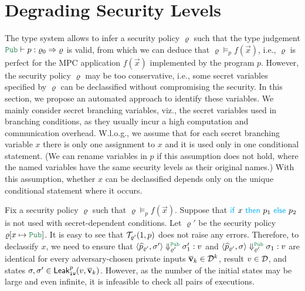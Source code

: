 \section{Degrading Security Levels}\label{sec:symbolicreasoning}
The type system allows to infer a security policy $\varrho$ such that the type judgement
$\Pub\vdash p:\varrho_0\Rightarrow\varrho$ is valid, from which we can deduce that
$\varrho\models_p f(\vec{x})$,
i.e., $\varrho$ is perfect for the MPC application $f(\vec{x})$ implemented by the program $p$.
However, the security policy $\varrho$ may be too conservative,
i.e., some secret variables specified by $\varrho$ can be declassified
without compromising the security. %
In this section, we propose an automated approach to identify these variables. We mainly consider secret branching variables, viz., the secret variables used in branching conditions, as they usually
incur a high computation and communication overhead.
%
W.l.o.g., we assume that for each secret branching variable  $x$ there is only one assignment to $x$ and it is used only in one conditional statement. %
(We can rename variables in $p$ if this assumption does not hold, where
the named variables have the same security levels as their original names.)
With this assumption, whether $x$ can be declassified depends
only on the unique conditional statement where it occurs.

Fix a security policy $\varrho$ such that $\varrho\models_p f(\vec{x})$.
Suppose that ${\Pif} \ x \ {\Pthen} \  p_1 \ {\Pelse} \ p_2$ is not used with secret-dependent conditions.
Let $\varrho'$ be the security policy $\varrho[x\mapsto \Pub]$. It is easy to see that
$\mathcal{T}_{\varrho'}(1,p)$ does not raise any errors.
Therefore, to declassify  $x$,
we need to ensure that %
$\MPCAngle{\widehat{p}_{\varrho'},\sigma'}\Downarrow_{\varrho'}^{\Pub} \sigma_1':v$
and $\MPCAngle{\widehat{p}_{\varrho'},\sigma}\Downarrow_{\varrho'}^{\Pub} \sigma_1:v$ are identical
for every adversary-chosen private inputs  $\overline{\bf{v}}_k\in\mathcal{D}^k$, result $v\in\mathcal{D}$,
and states $\sigma,\sigma'\in{\sf Leak}_{\tt iw}^p(v,\overline{\bf{v}}_k)$.
However, %
as the number of the initial states may be large and even infinite,
it is infeasible to  check all pairs of executions.

